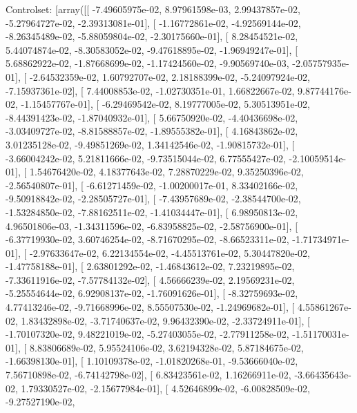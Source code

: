 \documentclass{article}
\begin{document}
Controlset: [array([[ -7.49605975e-02,   8.97961598e-03,   2.99437857e-02,
         -5.27964727e-02,  -2.39313081e-01],
       [ -1.16772861e-02,  -4.92569144e-02,  -8.26345489e-02,
         -5.88059804e-02,  -2.30175660e-01],
       [  8.28454521e-02,   5.44074874e-02,  -8.30583052e-02,
         -9.47618895e-02,  -1.96949247e-01],
       [  5.68862922e-02,  -1.87668699e-02,  -1.17424560e-02,
         -9.90569740e-03,  -2.05757935e-01],
       [ -2.64532359e-02,   1.60792707e-02,   2.18188399e-02,
         -5.24097924e-02,  -7.15937361e-02],
       [  7.44008853e-02,  -1.02730351e-01,   1.66822667e-02,
          9.87744176e-02,  -1.15457767e-01],
       [ -6.29469542e-02,   8.19777005e-02,   5.30513951e-02,
         -8.44391423e-02,  -1.87040932e-01],
       [  5.66750920e-02,  -4.40436698e-02,  -3.03409727e-02,
         -8.81588857e-02,  -1.89555382e-01],
       [  4.16843862e-02,   3.01235128e-02,  -9.49851269e-02,
          1.34142546e-02,  -1.90815732e-01],
       [ -3.66004242e-02,   5.21811666e-02,  -9.73515044e-02,
          6.77555427e-02,  -2.10059514e-01],
       [  1.54676420e-02,   4.18377643e-02,   7.28870229e-02,
          9.35250396e-02,  -2.56540807e-01],
       [ -6.61271459e-02,  -1.00200017e-01,   8.33402166e-02,
         -9.50918842e-02,  -2.28505727e-01],
       [ -7.43957689e-02,  -2.38544700e-02,  -1.53284850e-02,
         -7.88162511e-02,  -1.41034447e-01],
       [  6.98950813e-02,   4.96501806e-03,  -1.34311596e-02,
         -6.83958825e-02,  -2.58756900e-01],
       [ -6.37719930e-02,   3.60746254e-02,  -8.71670295e-02,
         -8.66523311e-02,  -1.71734971e-01],
       [ -2.97633647e-02,   6.22134554e-02,  -4.45513761e-02,
          5.30447820e-02,  -1.47758188e-01],
       [  2.63801292e-02,  -1.46843612e-02,   7.23219895e-02,
         -7.33611916e-02,  -7.57784132e-02],
       [  4.56666239e-02,   2.19569231e-02,  -5.25554644e-02,
          6.92908137e-02,  -1.76091626e-01],
       [ -8.32759693e-02,   4.77413246e-02,  -9.71668996e-02,
          8.55507530e-02,  -1.24969682e-01],
       [  4.55861267e-02,   1.83432898e-02,  -3.71740637e-02,
          9.96432390e-02,  -2.33724911e-01],
       [ -1.70107320e-02,   9.48221019e-02,  -5.27403055e-02,
         -2.77911258e-02,  -1.51170031e-01],
       [  8.83806689e-02,   5.95524106e-02,   3.62194328e-02,
          5.87184675e-02,  -1.66398130e-01],
       [  1.10109378e-02,  -1.01820268e-01,  -9.53666040e-02,
          7.56710898e-02,  -6.74142798e-02],
       [  6.83423561e-02,   1.16266911e-02,  -3.66435643e-02,
          1.79330527e-02,  -2.15677984e-01],
       [  4.52646899e-02,  -6.00828509e-02,  -9.27527190e-02,
\end{document}
